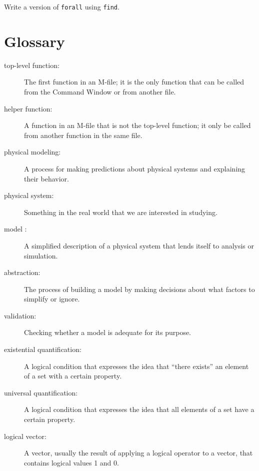 \documentclass{book}
\begin{document}
\begin{ex}
Write a version of {\tt forall} using {\tt find}.
\end{ex}


\section{Glossary}

\begin{description}

\item[top-level function:]  The first function in an M-file;
it is the only function that can be called from the Command
Window or from another file.

\item[helper function:] A function in an M-file that is not
the top-level function; it only be called from another function
in the same file.

\item[physical modeling:] A process
for making predictions about physical systems and explaining their
behavior.

\item[physical system:] Something in the real world that we are
interested in studying.

\item[model :] A simplified description of a
physical system that lends itself to analysis or simulation.

\item[abstraction:] The process of building a model by making
decisions about what factors to simplify or ignore.

\item[validation:] Checking whether a model is adequate for its
purpose.

\item[existential quantification:] A logical condition that expresses
the idea that ``there exists'' an element of a set with a certain
property.

\item[universal quantification:] A logical condition that expresses
the idea that all elements of a set have a certain property.

\item[logical vector:] A vector, usually the result of applying a logical
operator to a vector, that contains logical values 1 and 0.


\end{description}
\end{document}
